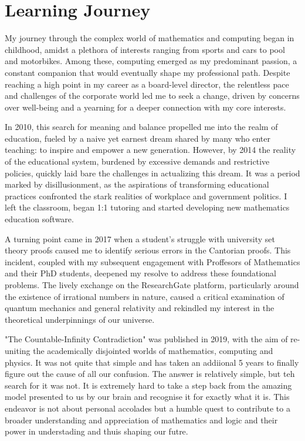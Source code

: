 \documentclass[12pt]{article}
\begin{document}
\section*{Learning Journey}
My journey through the complex world of mathematics and computing began in childhood, amidst a plethora of interests ranging from sports and cars to pool and motorbikes. Among these, computing emerged as my predominant passion, a constant companion that would eventually shape my professional path. Despite reaching a high point in my career as a board-level director\rDNA{}, the relentless pace and challenges of the corporate world led me to seek a change, driven by concerns over well-being and a yearning for a deeper connection with my core interests.

In 2010, this search for meaning and balance propelled me into the realm of education\rIoE{}, fueled by a naive yet earnest dream shared by many who enter teaching: to inspire and empower a new generation. However, by 2014 the reality of the educational system, burdened by excessive demands and restrictive policies, quickly laid bare the challenges in actualizing this dream. It was a period marked by disillusionment, as the aspirations of transforming educational practices confronted the stark realities of workplace and government politics. I left the classroom, began 1:1 tutoring and started developing new mathematics education software.

A turning point came in 2017 when a student's struggle with university set theory proofs caused me to identify serious errors in the Cantorian proofs. This incident, coupled with my subsequent engagement with Proffesors of Mathematics and their PhD students, deepened my resolve to address these foundational problems. The lively exchange on the ResearchGate platform, particularly around the existence of irrational numbers in nature, caused a critical examination of quantum mechanics and general relativity and rekindled my interest in the theoretical underpinnings of our universe.

"The Countable-Infinity Contradiction"\rCIC{} was published in 2019, with the aim of re-uniting the academically disjointed worlds of mathematics, computing and physics. It was not quite that simple and has taken an addiional 5 years to finally figure out the cause of all our confusion. The answer is relatively simple, but teh search for it was not. It is extremely hard to take a step back from the amazing model presented to us by our brain and recognise it for exactly what it is. This endeavor is not about personal accolades but a humble quest to contribute to a broader understanding and appreciation of mathematics and logic and their power in understading and thuis shaping our futre.
\end{document}

